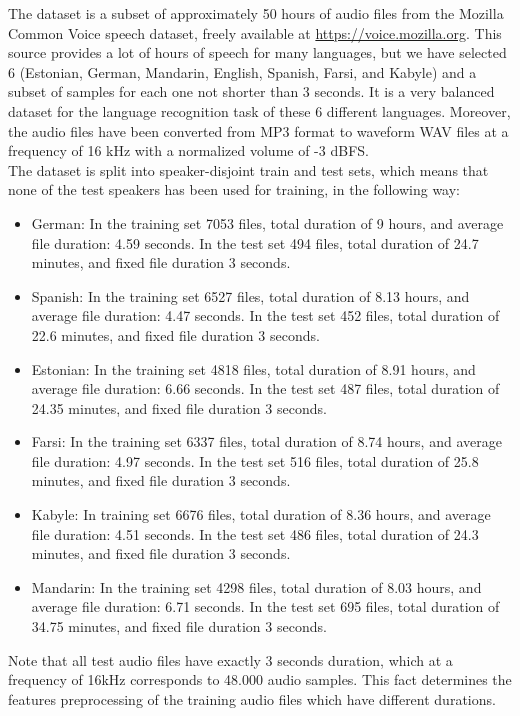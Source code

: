 \documentclass[12pt]{extarticle}
\begin{document}
The dataset is a subset of approximately 50 hours of audio files from the Mozilla Common Voice speech dataset, freely available at \url{https://voice.mozilla.org}. This source provides a lot of hours of speech for many languages, but we have selected 6 (Estonian, German, Mandarin, English, Spanish, Farsi, and Kabyle) and a subset of samples for each one not shorter than 3 seconds. It is a very balanced dataset for the language recognition task of these 6 different languages. Moreover, the audio files have been converted from MP3 format to waveform WAV files at a frequency of 16 kHz with a normalized volume of -3 dBFS.\\

\noindent The dataset is split into speaker-disjoint train and test sets, which means that none of the test speakers has been used for training, in the following way:

\begin{itemize}
    \item German: In the training set 7053 files, total duration of 9 hours, and average file duration: 4.59 seconds. In the test set 494 files, total duration of 24.7 minutes, and fixed file duration 3 seconds.
    \item Spanish: In the training set 6527 files, total duration of 8.13 hours, and average file duration: 4.47 seconds. In the test set 452 files, total duration of 22.6 minutes, and fixed file duration 3 seconds.
    \item Estonian: In the training set 4818 files, total duration of 8.91 hours, and average file duration: 6.66 seconds. In the test set 487 files, total duration of 24.35 minutes, and fixed file duration 3 seconds.
    \item Farsi: In the training set 6337 files, total duration of 8.74 hours, and average file duration: 4.97 seconds. In the test set 516 files, total duration of 25.8 minutes, and fixed file duration 3 seconds.
    \item Kabyle: In training set 6676 files, total duration of 8.36 hours, and average file duration: 4.51 seconds. In the test set 486 files, total duration of 24.3 minutes, and fixed file duration 3 seconds.
    \item Mandarin: In the training set 4298 files, total duration of 8.03 hours, and average file duration: 6.71 seconds. In the test set 695 files, total duration of 34.75 minutes, and fixed file duration 3 seconds.
\end{itemize}

\noindent Note that all test audio files have exactly 3 seconds duration, which at a frequency of 16kHz corresponds to 48.000 audio samples. This fact determines the features preprocessing of the training audio files which have different durations.
\end{document}
